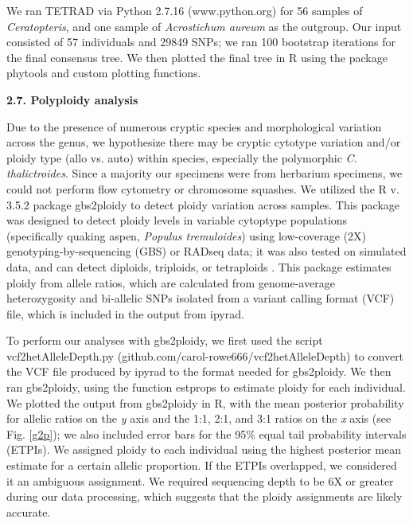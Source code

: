 \documentclass[12pt]{article}
\begin{document}
\begin{flushleft}
We ran {\small{TETRAD}} via Python 2.7.16 (www.python.org) for 56 samples of \textit{Ceratopteris}, and one sample of \textit{Acrostichum aureum} as the outgroup. Our input consisted of 57 individuals and 29849 SNPs; we ran 100 bootstrap iterations for the final consensus tree. We then plotted the final tree in R using the package phytools \autocite{Revell2012} and custom plotting functions.


\textbf{2.7. Polyploidy analysis}

Due to the presence of numerous cryptic species and morphological variation across the genus, we hypothesize there may be cryptic cytotype variation and/or ploidy type (allo vs. auto) within species, especially the polymorphic \textit{C. thalictroides}. Since a majority our specimens were from herbarium specimens, we could not perform flow cytometry or chromosome squashes. We utilized the R v. 3.5.2 \autocite{R_352} package gbs2ploidy to detect ploidy variation across samples. This package was designed to detect ploidy levels in variable cytoptype populations (specifically quaking aspen, \textit{Populus tremuloides}) using low-coverage (2X) genotyping-by-sequencing (GBS) or RADseq data; it was also tested on simulated data, and can detect diploids, triploids, or tetraploids \autocite{Gompert2017}. This package estimates ploidy from allele ratios, which are calculated from genome-average heterozygosity and bi-allelic SNPs isolated from a variant calling format (VCF) file, which is included in the output from ipyrad.

To perform our analyses with gbs2ploidy, we first used the script vcf2hetAlleleDepth.py (github.com/carol-rowe666/vcf2hetAlleleDepth) to convert the VCF file produced by ipyrad to the format needed for gbs2ploidy. We then ran gbs2ploidy, using the function estprops to estimate ploidy for each individual. We plotted the output from gbs2ploidy in R, with the mean posterior probability for allelic ratios on the \textit{y} axis and the 1:1, 2:1, and 3:1 ratios on the \textit{x} axis (see Fig. \ref{g2p}); we also included error bars for the 95\% equal tail probability intervals (ETPIs). We assigned ploidy to each individual using the  highest posterior mean estimate for a certain allelic proportion. If the ETPIs overlapped, we considered it an ambiguous assignment. We required sequencing depth to be 6X or greater during our data processing, which suggests that the ploidy assignments are likely accurate.


\end{flushleft}
\end{document}
